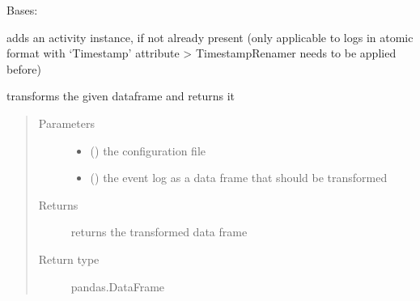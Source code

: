 \documentclass[letterpaper,10pt,english]{sphinxmanual}
\begin{document}
\begin{fulllineitems}
\label{\detokenize{event_log_analyzer:event_log_analyzer.adapter.ActivityInstanceAdder}}
\sphinxAtStartPar
Bases: {\hyperref[\detokenize{event_log_analyzer:event_log_analyzer.adapter.Adapter}]{}}

\sphinxAtStartPar
adds an activity instance, if not already present (only applicable to logs in atomic format with ‘Timestamp’ attribute \sphinxhyphen{}\textgreater{} TimestampRenamer needs to be applied before)

\begin{fulllineitems}
\label{\detokenize{event_log_analyzer:event_log_analyzer.adapter.ActivityInstanceAdder.transform}}
\sphinxAtStartPar
transforms the given dataframe and returns it
\begin{quote}\begin{description}
\item[{Parameters}] \leavevmode\begin{itemize}
\item {} 
\sphinxAtStartPar
{} () \textendash{} the configuration file

\item {} 
\sphinxAtStartPar
{} () \textendash{} the event log as a data frame that should be transformed

\end{itemize}

\item[{Returns}] \leavevmode
\sphinxAtStartPar
returns the transformed data frame

\item[{Return type}] \leavevmode
\sphinxAtStartPar
pandas.DataFrame

\end{description}\end{quote}

\end{fulllineitems}


\end{fulllineitems}
\end{document}
